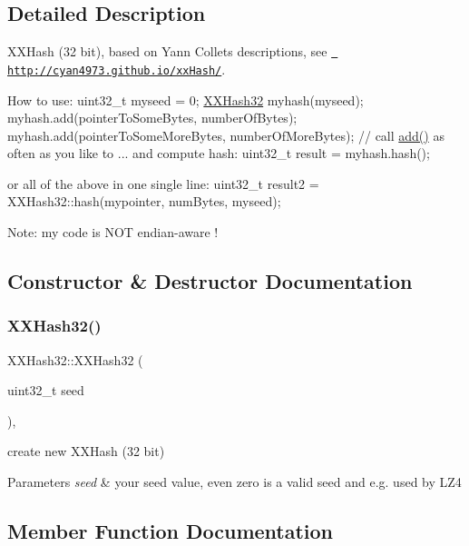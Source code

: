 \subsection{Detailed Description}
X\+X\+Hash (32 bit), based on Yann Collet\textquotesingle{}s descriptions, see \href{http://cyan4973.github.io/xxHash/}{\texttt{ http\+://cyan4973.\+github.\+io/xx\+Hash/}}. 

How to use\+: uint32\+\_\+t myseed = 0; \mbox{\hyperlink{class_x_x_hash32}{X\+X\+Hash32}} myhash(myseed); myhash.\+add(pointer\+To\+Some\+Bytes,     number\+Of\+Bytes); myhash.\+add(pointer\+To\+Some\+More\+Bytes, number\+Of\+More\+Bytes); // call \mbox{\hyperlink{class_x_x_hash32_a6891bb0b717d1375bb91981ecb457d00}{add()}} as often as you like to ... and compute hash\+: uint32\+\_\+t result = myhash.\+hash();

or all of the above in one single line\+: uint32\+\_\+t result2 = X\+X\+Hash32\+::hash(mypointer, num\+Bytes, myseed);

Note\+: my code is N\+OT endian-\/aware ! 

\subsection{Constructor \& Destructor Documentation}
\mbox{\label{class_x_x_hash32_a9268fe6539b8e63a941b37b688f2e736}} 
\subsubsection{\texorpdfstring{XXHash32()}{XXHash32()}}
{\footnotesize\ttfamily X\+X\+Hash32\+::\+X\+X\+Hash32 (\begin{DoxyParamCaption}\item[{uint32\+\_\+t}]{seed }\end{DoxyParamCaption})\hspace{0.3cm}{\ttfamily [inline]}, {\ttfamily [explicit]}}



create new X\+X\+Hash (32 bit) 


\begin{DoxyParams}{Parameters}
{\em seed} & your seed value, even zero is a valid seed and e.\+g. used by L\+Z4 \\
\hline
\end{DoxyParams}


\subsection{Member Function Documentation}
\mbox{\label{class_x_x_hash32_a6891bb0b717d1375bb91981ecb457d00}} 
